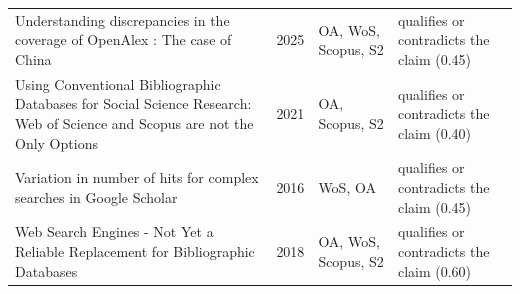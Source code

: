 \begin{longtable}{@{}%
  >{\raggedright\arraybackslash}p{}c%
  >{\raggedright\arraybackslash}p{}%
  >{\raggedright\arraybackslash}p{}@{}}
Understanding discrepancies in the coverage of OpenAlex : The case of China & 2025 & OA, WoS, Scopus, S2 & qualifies or contradicts the claim (0.45) \\
Using Conventional Bibliographic Databases for Social Science Research: Web of Science and Scopus are not the Only Options & 2021 & OA, Scopus, S2 & qualifies or contradicts the claim (0.40) \\
Variation in number of hits for complex searches in Google Scholar & 2016 & WoS, OA & qualifies or contradicts the claim (0.45) \\
Web Search Engines - Not Yet a Reliable Replacement for Bibliographic Databases & 2018 & OA, WoS, Scopus, S2 & qualifies or contradicts the claim (0.60) \\
\end{longtable}
\endgroup
